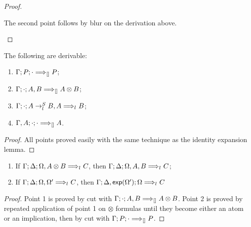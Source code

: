 \begin{proof}
\begin{enumerate}
    The second point follows by blur on the derivation above.
  \end{enumerate}
\end{proof}

\begin{lemma}\label{idhelplemma}
  The following are derivable:
  \begin{enumerate}
  \item $\Gamma; P; \cdot \Longrightarrow_{[]{}} P$;
  \item $\Gamma; \cdot; A, B \Longrightarrow_{[]{}} A \otimes B$;
  \item $\Gamma; \cdot; A \rightarrow_{l_{}}^S B,
      A \Longrightarrow_{l_{}} B$;
  \item $\Gamma, A; \cdot; \cdot \Longrightarrow_{[]{}} A$.
  \end{enumerate}
\end{lemma}
\begin{proof}
  All points proved easily with the same technique as the identity expansion
  lemma.
\end{proof}

\begin{lemma}\label{activeinversion}\mbox{}
  \begin{enumerate}
  \item If $\Gamma; \Delta; \Omega, A \otimes B \Longrightarrow_{l_{}} C$, then
    $\Gamma; \Delta; \Omega, A, B \Longrightarrow_{l_{}} C$;
  \item If $\Gamma; \Delta; \Omega, \Omega' \Longrightarrow_{l_{}} C$, then
    $\Gamma; \Delta, \textsf{exp}(\Omega'); \Omega \Longrightarrow_{l_{}} C$
  \end{enumerate}
\end{lemma}
\begin{proof}
  Point 1 is proved by cut with
  $\Gamma; \cdot; A, B \Longrightarrow_{[]{}} A \otimes B$. Point 2 is proved by
  repeated application of point 1 on $\otimes$ formulas until they become either
  an atom or an implication, then by cut with
  $\Gamma; P; \cdot \Longrightarrow_{[]{}} P$.
\end{proof}

